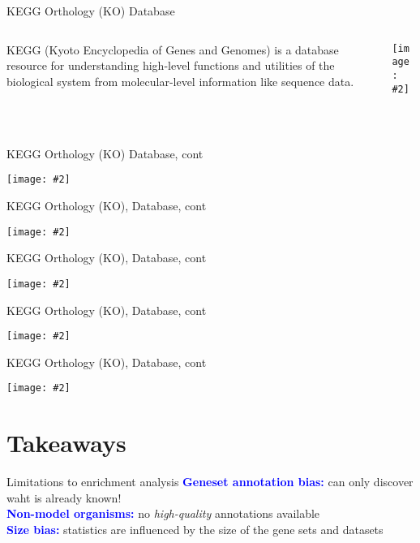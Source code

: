 \documentclass{beamer}
\renewcommand{\c}[1]{\begin{center}#1\end{center}}
\newcommand{\blu}[1]{\textcolor{blue}{\textbf{#1}}}
\newcommand{\gr}[2][.95]{\c{\texttt{[image: \#2]}}}
\begin{document}
\begin{frame}{KEGG Orthology (KO) Database}
    \begin{columns}
        \begin{column}{0.6\textwidth}
            KEGG (Kyoto Encyclopedia of Genes and Genomes) is a database resource for understanding high-level functions and utilities of the biological system from molecular-level information like sequence data.
        \end{column}
        \begin{column}{0.4\textwidth}
            \gr{l7_figs/s19_kegg1.png}
        \end{column}
    \end{columns}\\
    \bigskip
\end{frame}

\begin{frame}{KEGG Orthology (KO) Database, cont}
    \gr{l7_figs/s20_kegg2.png}
\end{frame}

\begin{frame}{KEGG Orthology (KO), Database, cont}
    \gr{l7_figs/s21_kegg3.png}
\end{frame}

\begin{frame}{KEGG Orthology (KO), Database, cont}
    \gr{l7_figs/s22_kegg4.png}
\end{frame}

\begin{frame}{KEGG Orthology (KO), Database, cont}
    \gr{l7_figs/s23_kegg5.png}
\end{frame}

\begin{frame}{KEGG Orthology (KO), Database, cont}
    \gr{l7_figs/s24_kegg6.png}
\end{frame}

\section{Takeaways}

\begin{frame}{Limitations to enrichment analysis}
    \blu{Geneset annotation bias:} can only discover waht is already known!\\
    \bigskip
    \blu{Non-model organisms:} no \textit{high-quality} annotations available\\
    \bigskip
    \blu{Size bias:} statistics are influenced by the size of the gene sets and datasets
\end{frame}
\end{document}

